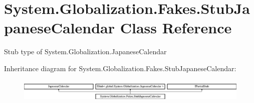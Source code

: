 \hypertarget{class_system_1_1_globalization_1_1_fakes_1_1_stub_japanese_calendar}{\section{System.\-Globalization.\-Fakes.\-Stub\-Japanese\-Calendar Class Reference}
\label{class_system_1_1_globalization_1_1_fakes_1_1_stub_japanese_calendar}
}


Stub type of System.\-Globalization.\-Japanese\-Calendar 


Inheritance diagram for System.\-Globalization.\-Fakes.\-Stub\-Japanese\-Calendar\-:\begin{figure}[H]
\begin{center}
\leavevmode
\includegraphics[height=1.107814cm]{class_system_1_1_globalization_1_1_fakes_1_1_stub_japanese_calendar}
\end{center}
\end{figure}
